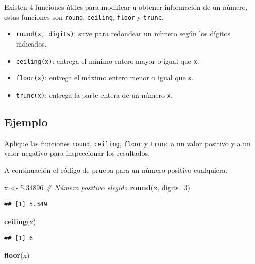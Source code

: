 \documentclass[10pt,]{krantz}
\makeatletter
\newenvironment{Shaded}{\begin{snugshade}}{\end{snugshade}}
\newcommand{\KeywordTok}[1]{\textcolor[rgb]{0.13,0.29,0.53}{\textbf{{#1}}}}
\newcommand{\DataTypeTok}[1]{\textcolor[rgb]{0.13,0.29,0.53}{{#1}}}
\newcommand{\DecValTok}[1]{\textcolor[rgb]{0.00,0.00,0.81}{{#1}}}
\newcommand{\FloatTok}[1]{\textcolor[rgb]{0.00,0.00,0.81}{{#1}}}
\newcommand{\StringTok}[1]{\textcolor[rgb]{0.31,0.60,0.02}{{#1}}}
\newcommand{\CommentTok}[1]{\textcolor[rgb]{0.56,0.35,0.01}{\textit{{#1}}}}
\newcommand{\NormalTok}[1]{{#1}}
\providecommand{\tightlist}{%
  \setlength{\itemsep}{0pt}\setlength{\parskip}{0pt}}
\newenvironment{kframe}{%
\medskip{}
\setlength{\fboxsep}{.8em}
 \def\at@end@of@kframe{}%
 \ifinner\ifhmode%
  \def\at@end@of@kframe{\end{minipage}}%
  \begin{minipage}{\columnwidth}%
 \fi\fi%
 \def\FrameCommand##1{\hskip\@totalleftmargin \hskip-\fboxsep
 \colorbox{shadecolor}{##1}\hskip-\fboxsep
     \hskip-\linewidth \hskip-\@totalleftmargin \hskip\columnwidth}%
 \MakeFramed {\advance\hsize-\width
   \@totalleftmargin\z@ \linewidth\hsize
   \@setminipage}}%
 {\par\unskip\endMakeFramed%
 \at@end@of@kframe}
\renewenvironment{Shaded}{\begin{kframe}}{\end{kframe}}
\makeatother
\begin{document}
Existen 4 funciones útiles para modificar u obtener información de un
número, estas funciones son \texttt{round}, \texttt{ceiling},
\texttt{floor} y \texttt{trunc}.

\begin{itemize}
\tightlist
\item
  \texttt{round(x,\ digits)}: sirve para redondear un número según los
  dígitos indicados.
\item
  \texttt{ceiling(x)}: entrega el mínimo entero mayor o igual que
  \texttt{x}.
\item
  \texttt{floor(x)}: entrega el máximo entero menor o igual que
  \texttt{x}.
\item
  \texttt{trunc(x)}: entrega la parte entera de un número \texttt{x}.
\end{itemize}

\subsection*{Ejemplo}\label{ejemplo-13}


Aplique las funciones \texttt{round}, \texttt{ceiling}, \texttt{floor} y
\texttt{trunc} a un valor positivo y a un valor negativo para
inspeccionar los resultados.

A continuación el código de prueba para un número positivo cualquiera.

\begin{Shaded}
\begin{Highlighting}[]
\NormalTok{x <-}\StringTok{ }\FloatTok{5.34896}  \CommentTok{# Número positivo elegido}
\KeywordTok{round}\NormalTok{(x, }\DataTypeTok{digits=}\DecValTok{3}\NormalTok{)}
\end{Highlighting}
\end{Shaded}

\begin{verbatim}
## [1] 5.349
\end{verbatim}

\begin{Shaded}
\begin{Highlighting}[]
\KeywordTok{ceiling}\NormalTok{(x)}
\end{Highlighting}
\end{Shaded}

\begin{verbatim}
## [1] 6
\end{verbatim}

\begin{Shaded}
\begin{Highlighting}[]
\KeywordTok{floor}\NormalTok{(x)}
\end{Highlighting}
\end{Shaded}
\end{document}
